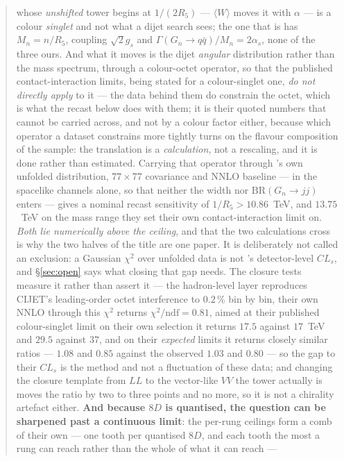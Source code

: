 \documentclass[11pt,a4paper]{article}
\begin{document}
\begin{abstract}
whose \emph{unshifted} tower begins at $1/(2R_5)$ --- $\langle W\rangle$ moves it with $\alpha$ ---
is a colour \emph{singlet} and not what a dijet search sees; the one that is has $M_n=n/R_5$,
coupling $\sqrt2 g_s$ and $\Gamma(G_n\to q\bar q)/M_n=2\alpha_s$, none of the three ours. And
what it moves is the dijet \emph{angular} distribution rather than the mass spectrum, through a
colour-octet operator, so that the published contact-interaction limits, being stated for a
colour-singlet one, \emph{do not directly apply} to it --- the data behind them do constrain the
octet, which is what the recast below does with them; it is their quoted numbers that cannot be
carried across, and not by a colour factor either, because which operator a
dataset constrains more tightly turns on the flavour composition of the sample: the translation is
a \emph{calculation}, not a rescaling, and it is done rather than estimated. Carrying that operator through \cite{CMSangular}'s own unfolded distribution, $77\times77$
covariance and NNLO baseline --- in the spacelike channels alone, so that neither the width nor
$\mathrm{BR}(G_n\to jj)$ enters --- gives a nominal recast sensitivity of $1/R_5>10.86$~TeV, and
$13.75$~TeV on the mass range they set their own contact-interaction limit on. \emph{Both lie
numerically above the ceiling}, and that the two calculations cross is why the two halves of the
title are one paper. It is deliberately not
called an exclusion: a Gaussian $\chi^2$ over unfolded data is not \cite{CMSangular}'s
detector-level $CL_s$, and \S\ref{sec:open} says what closing that gap needs. The closure tests
measure it rather than assert it --- the hadron-level layer reproduces CIJET's leading-order octet
interference to $0.2\,\%$ bin by bin, their own NNLO through this $\chi^2$ returns
$\chi^2/\mathrm{ndf}=0.81$, aimed at their published colour-singlet limit on their own
selection it returns $17.5$ against $17$~TeV and $29.5$ against $37$, and on their \emph{expected}
limits it returns closely similar ratios --- $1.08$ and $0.85$ against the observed $1.03$ and
$0.80$ --- so the gap to their $CL_s$ is the method and not a
fluctuation of these data; and changing the closure template from $LL$ to the vector-like $VV$ the
tower actually is moves the ratio by two to three points and no more, so it is not a chirality
artefact either. \textbf{And because $8D$ is quantised, the question can be sharpened
past a continuous limit}: the per-rung ceilings form a comb of their own --- one tooth per quantised $8D$, and each
tooth the most a rung can reach rather than the whole of what it can reach ---

\end{abstract}
\end{document}
